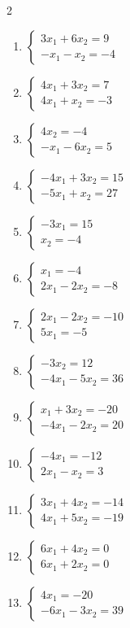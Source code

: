 \begin{multicols}{2}
\begin{enumerate}[label=\arabic*., leftmargin=*]
\item $\begin{cases}3x_1+6x_2=9\\-x_1-x_2=-4\end{cases}$
\item $\begin{cases}4x_1+3x_2=7\\4x_1+x_2=-3\end{cases}$
\item $\begin{cases}4x_2=-4\\-x_1-6x_2=5\end{cases}$
\item $\begin{cases}-4x_1+3x_2=15\\-5x_1+x_2=27\end{cases}$
\item $\begin{cases}-3x_1=15\\x_2=-4\end{cases}$
\item $\begin{cases}x_1=-4\\2x_1-2x_2=-8\end{cases}$
\item $\begin{cases}2x_1-2x_2=-10\\5x_1=-5\end{cases}$
\item $\begin{cases}-3x_2=12\\-4x_1-5x_2=36\end{cases}$
\item $\begin{cases}x_1+3x_2=-20\\-4x_1-2x_2=20\end{cases}$
\item $\begin{cases}-4x_1=-12\\2x_1-x_2=3\end{cases}$
\item $\begin{cases}3x_1+4x_2=-14\\4x_1+5x_2=-19\end{cases}$
\item $\begin{cases}6x_1+4x_2=0\\6x_1+2x_2=0\end{cases}$
\item $\begin{cases}4x_1=-20\\-6x_1-3x_2=39\end{cases}$

\end{enumerate}
\end{multicols}
